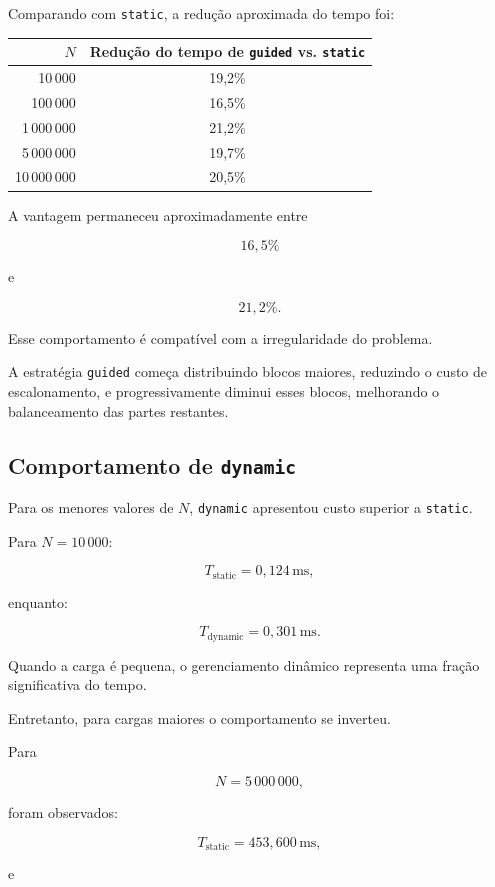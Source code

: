 Comparando com \texttt{static}, a redução aproximada do tempo foi:

\begin{center}
\begin{tabular}{|r|c|}
\hline
\textbf{\(N\)} & \textbf{Redução do tempo de \texttt{guided} vs.
\texttt{static}} \\
\hline
10\,000 & 19,2\% \\
100\,000 & 16,5\% \\
1\,000\,000 & 21,2\% \\
5\,000\,000 & 19,7\% \\
10\,000\,000 & 20,5\% \\
\hline
\end{tabular}
\end{center}

A vantagem permaneceu aproximadamente entre

\[
16,5\%
\]

e

\[
21,2\%.
\]

Esse comportamento é compatível com a irregularidade do problema.

A estratégia \texttt{guided} começa distribuindo blocos maiores, reduzindo o
custo de escalonamento, e progressivamente diminui esses blocos, melhorando
o balanceamento das partes restantes.


\subsection{Comportamento de \texttt{dynamic}}

Para os menores valores de \(N\), \texttt{dynamic} apresentou custo superior
a \texttt{static}.

Para \(N=10\,000\):

\[
T_{\mathrm{static}}
=
0,124\,\mathrm{ms},
\]

enquanto:

\[
T_{\mathrm{dynamic}}
=
0,301\,\mathrm{ms}.
\]

Quando a carga é pequena, o gerenciamento dinâmico representa uma fração
significativa do tempo.

Entretanto, para cargas maiores o comportamento se inverteu.

Para

\[
N=5\,000\,000,
\]

foram observados:

\[
T_{\mathrm{static}}
=
453,600\,\mathrm{ms},
\]

e

